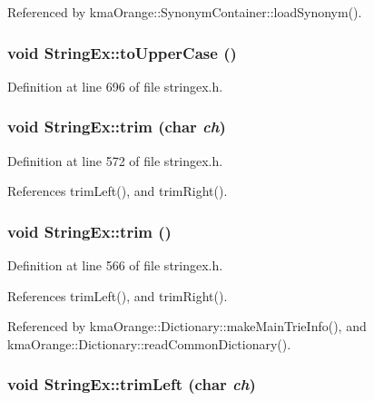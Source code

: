 Referenced by kmaOrange::SynonymContainer::loadSynonym().\hypertarget{classStringEx_fae06b05072e4fcd4e62ea9d2431336d}{
\subsubsection[{toUpperCase}]{\setlength{\rightskip}{0pt plus 5cm}void StringEx::toUpperCase ()}}
\label{classStringEx_fae06b05072e4fcd4e62ea9d2431336d}




Definition at line 696 of file stringex.h.\hypertarget{classStringEx_48fbbe07c043f88eb2d2e00f9b860f4c}{
\subsubsection[{trim}]{\setlength{\rightskip}{0pt plus 5cm}void StringEx::trim (char {\em ch})}}
\label{classStringEx_48fbbe07c043f88eb2d2e00f9b860f4c}




Definition at line 572 of file stringex.h.

References trimLeft(), and trimRight().\hypertarget{classStringEx_d36b21f97aac5288fa44243bcb9a696a}{
\subsubsection[{trim}]{\setlength{\rightskip}{0pt plus 5cm}void StringEx::trim ()}}
\label{classStringEx_d36b21f97aac5288fa44243bcb9a696a}




Definition at line 566 of file stringex.h.

References trimLeft(), and trimRight().

Referenced by kmaOrange::Dictionary::makeMainTrieInfo(), and kmaOrange::Dictionary::readCommonDictionary().\hypertarget{classStringEx_d5e480621a65dcbf6d5bee88a9c66509}{
\subsubsection[{trimLeft}]{\setlength{\rightskip}{0pt plus 5cm}void StringEx::trimLeft (char {\em ch})}}
\label{classStringEx_d5e480621a65dcbf6d5bee88a9c66509}




